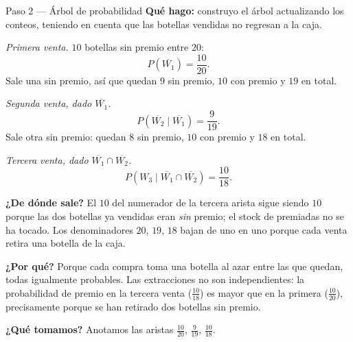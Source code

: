 \documentclass[11pt]{article}
\begin{document}
\begin{paso}{Paso 2 --- Árbol de probabilidad}
\textbf{Qué hago:} construyo el árbol actualizando los conteos, teniendo en cuenta que las botellas vendidas no regresan a la caja.

\emph{Primera venta.} $10$ botellas sin premio entre $20$:
\[
P(\overline{W_1})=\frac{10}{20}.
\]
Sale una sin premio, así que quedan $9$ sin premio, $10$ con premio y $19$ en total.

\emph{Segunda venta, dado $\overline{W_1}$.}
\[
P(\overline{W_2}\mid \overline{W_1})=\frac{9}{19}.
\]
Sale otra sin premio: quedan $8$ sin premio, $10$ con premio y $18$ en total.

\emph{Tercera venta, dado $\overline{W_1}\cap\overline{W_2}$.}
\[
P(W_3\mid \overline{W_1}\cap\overline{W_2})=\frac{10}{18}.
\]

\begin{center}
\end{center}

\textbf{¿De dónde sale?} El $10$ del numerador de la tercera arista sigue siendo $10$ porque las dos botellas ya vendidas eran \emph{sin} premio; el stock de premiadas no se ha tocado. Los denominadores $20$, $19$, $18$ bajan de uno en uno porque cada venta retira una botella de la caja.

\textbf{¿Por qué?} Porque cada compra toma una botella al azar entre las que quedan, todas igualmente probables. Las extracciones no son independientes: la probabilidad de premio en la tercera venta ($\tfrac{10}{18}$) es mayor que en la primera ($\tfrac{10}{20}$), precisamente porque se han retirado dos botellas sin premio.

\textbf{¿Qué tomamos?} Anotamos las aristas $\tfrac{10}{20}$, $\tfrac{9}{19}$, $\tfrac{10}{18}$.
\end{paso}
\end{document}
